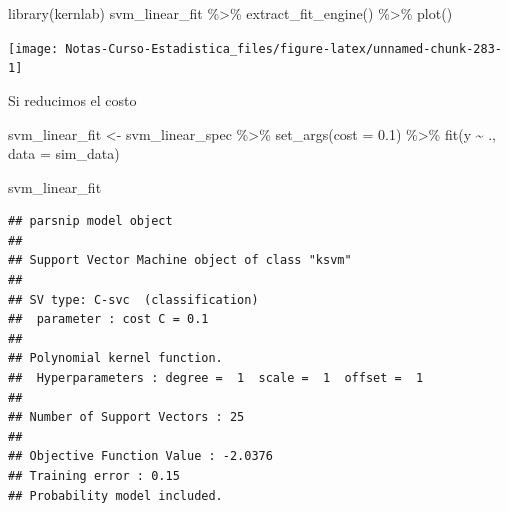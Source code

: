 \documentclass[
  12pt,
]{book}
\newenvironment{Shaded}{\begin{snugshade}}{\end{snugshade}}
\newcommand{\AttributeTok}[1]{\textcolor[rgb]{0.77,0.63,0.00}{#1}}
\newcommand{\FloatTok}[1]{\textcolor[rgb]{0.00,0.00,0.81}{#1}}
\newcommand{\FunctionTok}[1]{\textcolor[rgb]{0.00,0.00,0.00}{#1}}
\newcommand{\NormalTok}[1]{#1}
\newcommand{\OtherTok}[1]{\textcolor[rgb]{0.56,0.35,0.01}{#1}}
\newcommand{\SpecialCharTok}[1]{\textcolor[rgb]{0.00,0.00,0.00}{#1}}
\theoremstyle{definition}
\theoremstyle{definition}
\theoremstyle{definition}
\theoremstyle{definition}
\theoremstyle{remark}
\begin{document}
\begin{Shaded}
\begin{Highlighting}[]
\FunctionTok{library}\NormalTok{(kernlab)}
\NormalTok{svm\_linear\_fit }\SpecialCharTok{\%\textgreater{}\%}
    \FunctionTok{extract\_fit\_engine}\NormalTok{() }\SpecialCharTok{\%\textgreater{}\%}
    \FunctionTok{plot}\NormalTok{()}
\end{Highlighting}
\end{Shaded}

\begin{center}\texttt{[image: Notas-Curso-Estadistica\_files/figure-latex/unnamed-chunk-283-1]} \end{center}

Si reducimos el costo

\begin{Shaded}
\begin{Highlighting}[]
\NormalTok{svm\_linear\_fit }\OtherTok{\textless{}{-}}\NormalTok{ svm\_linear\_spec }\SpecialCharTok{\%\textgreater{}\%}
    \FunctionTok{set\_args}\NormalTok{(}\AttributeTok{cost =} \FloatTok{0.1}\NormalTok{) }\SpecialCharTok{\%\textgreater{}\%}
    \FunctionTok{fit}\NormalTok{(y }\SpecialCharTok{\textasciitilde{}}\NormalTok{ ., }\AttributeTok{data =}\NormalTok{ sim\_data)}

\NormalTok{svm\_linear\_fit}
\end{Highlighting}
\end{Shaded}

\begin{verbatim}
## parsnip model object
## 
## Support Vector Machine object of class "ksvm" 
## 
## SV type: C-svc  (classification) 
##  parameter : cost C = 0.1 
## 
## Polynomial kernel function. 
##  Hyperparameters : degree =  1  scale =  1  offset =  1 
## 
## Number of Support Vectors : 25 
## 
## Objective Function Value : -2.0376 
## Training error : 0.15 
## Probability model included.
\end{verbatim}
\end{document}
